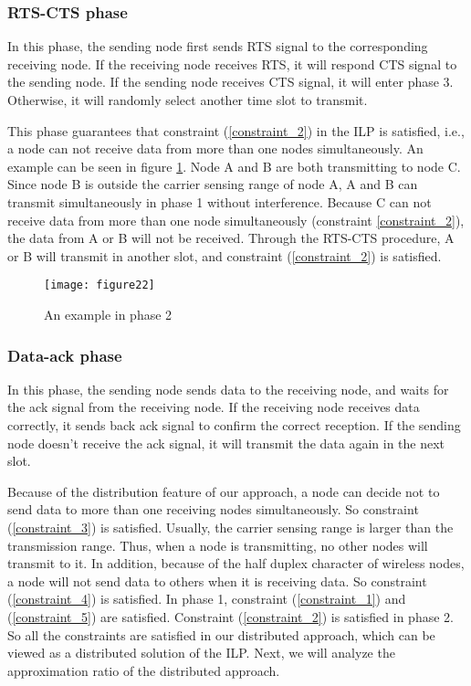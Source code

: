 \documentclass[conference]{IEEEtran}
\begin{document}
\subsubsection{RTS-CTS phase}
In this phase, the sending node  first sends RTS signal to the
corresponding receiving node. If the receiving node receives RTS, it
will respond CTS signal to the sending node. If the sending node
receives CTS signal, it will enter phase 3. Otherwise, it will
randomly select another time slot to transmit.

This phase guarantees that constraint (\ref{constraint_2}) in the
ILP is satisfied, i.e., a node can not receive data from more than
one nodes simultaneously. An example can be seen in figure
\ref{Fig:example in phase 2}. Node A and B are both transmitting to
node C. Since node B is outside the carrier sensing range of node A,
A and B can transmit simultaneously in phase 1 without interference.
Because C can not receive data from more than one node
simultaneously (constraint \ref{constraint_2}), the data from A or B
will not be received. Through the RTS-CTS procedure, A or B will
transmit in another slot, and constraint (\ref{constraint_2}) is
satisfied.
\begin{figure}[!h]
\centering
\texttt{[image: figure22]}
\caption{An example in phase 2} \label{Fig:example in phase 2}
\end{figure}
\subsubsection{Data-ack phase}
In this phase, the sending node sends data to the receiving node,
and waits for the ack signal from the receiving node. If the
receiving node receives data correctly, it sends back ack signal to
confirm the correct reception. If the sending node doesn't receive
the ack signal, it will transmit the data again in the next slot.

Because of the distribution feature of our approach, a node can
decide not to send data to more than one receiving nodes
simultaneously. So constraint (\ref{constraint_3}) is satisfied.
Usually, the carrier sensing range is larger than the transmission
range. Thus, when a node is transmitting, no other nodes will
transmit to it. In addition, because of the half duplex character of
wireless nodes, a node will not send data to others when it is
receiving data. So constraint (\ref{constraint_4}) is satisfied. In
phase 1, constraint (\ref{constraint_1}) and (\ref{constraint_5})
are satisfied. Constraint (\ref{constraint_2}) is satisfied in phase
2. So all the constraints are satisfied in our distributed approach,
which can be viewed as a distributed solution of the ILP. Next, we
will analyze the approximation ratio of the distributed approach.
\end{document}
